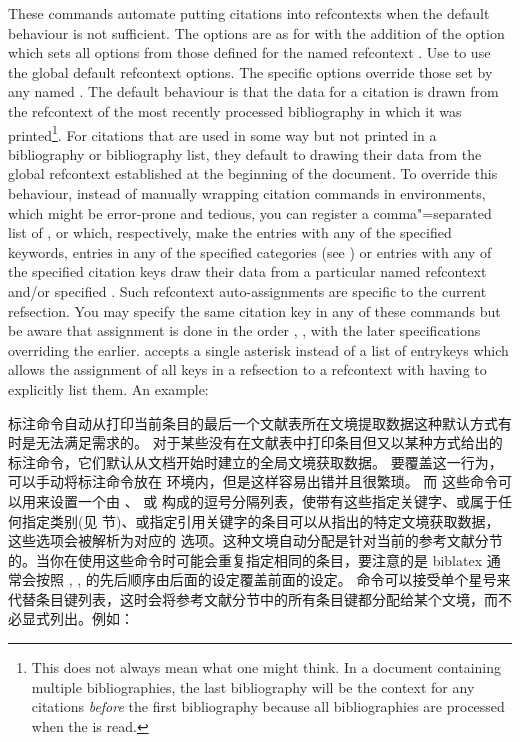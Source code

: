  These commands automate putting citations into refcontexts when the default behaviour is not sufficient. The  options are as for  with the addition of the  option which sets all options from those defined for the named refcontext . Use  to use the global default refcontext options. The specific \keyval options override those set by any named . The default behaviour is that the data for a citation is drawn from the refcontext of the most recently processed bibliography in which it was printed\footnote{This does not always mean what one might think. In a document containing multiple bibliographies, the last bibliography will be the context for any citations \emph{before} the first bibliography because all bibliographies are processed when the  is read.}. For citations that are used in some way but not printed in a bibliography or bibliography list, they default to drawing their data from the global refcontext established at the beginning of the document. To override this behaviour, instead of manually wrapping citation commands in  environments, which might be error-prone and tedious, you can register a comma"=separated list of ,  or  which, respectively, make the entries with any of the specified keywords, entries in any of the specified categories (see ) or entries with any of the specified citation keys draw their data from a particular named refcontext and/or specified . Such refcontext auto-assignments are specific to the current refsection. You may specify the same citation key in any of these commands but be aware that assignment is done in the order , ,  with the later specifications overriding the earlier.  accepts a single asterisk instead of a list of entrykeys which allows the assignment of all keys in a refsection to a refcontext with having to explicitly list them. An example:

标注命令自动从打印当前条目的最后一个文献表所在文境提取数据这种默认方式有时是无法满足需求的。
对于某些没有在文献表中打印条目但又以某种方式给出的标注命令，它们默认从文档开始时建立的全局文境获取数据。
要覆盖这一行为，可以手动将标注命令放在  环境内，但是这样容易出错并且很繁琐。
而 这些命令可以用来设置一个由 、 或  构成的逗号分隔列表，使带有这些指定关键字、或属于任何指定类别(见  节)、或指定引用关键字的条目可以从指出的特定文境获取数据，这些选项会被解析为对应的  选项。这种文境自动分配是针对当前的参考文献分节的。当你在使用这些命令时可能会重复指定相同的条目，要注意的是 biblatex 通常会按照 , ,  的先后顺序由后面的设定覆盖前面的设定。
 命令可以接受单个星号来代替条目键列表，这时会将参考文献分节中的所有条目键都分配给某个文境，而不必显式列出。例如：

